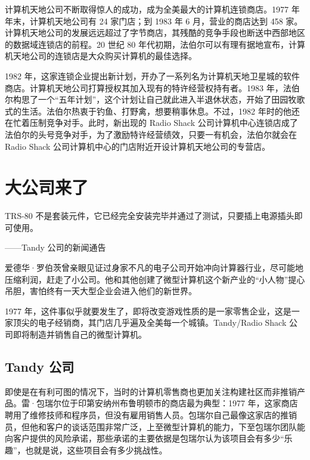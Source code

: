 \documentclass[12pt,UTF8]{ctexbook}
\begin{document}
计算机天地公司不断取得惊人的成功，成为全美最大的计算机连锁商店。1977 年年末，计算机天地公司有 24 家门店；到 1983 年 6 月，营业的商店达到 458 家。计算机天地公司的发展远远超过了字节商店，其残酷的竞争手段也断送中西部地区的数据域连锁店的前程。20 世纪 80 年代初期，法伯尔可以有理有据地宣布，计算机天地公司的连锁店是大众购买计算机的最佳选择。

1982 年，这家连锁企业提出新计划，开办了一系列名为计算机天地卫星城的软件商店。计算机天地公司打算授权其加入现有的特许经营权持有者。1983 年，法伯尔构思了一个“五年计划”，这个计划让自己就此进入半退休状态，开始了田园牧歌式的生活。法伯尔热衷于钓鱼、打野禽，想要稍事休息。不过，1982 年时的他还在忙着压制竞争对手。此时，新出现的 Radio Shack 公司计算机中心连锁店成了法伯尔的头号竞争对手，为了激励特许经营绩效，只要一有机会，法伯尔就会在 Radio Shack 公司计算机中心的门店附近开设计算机天地公司的专营店。





\section{大公司来了}


TRS-80 不是套装元件，它已经完全安装完毕并通过了测试，只要插上电源插头即可使用。

——Tandy 公司的新闻通告



爱德华·罗伯茨曾亲眼见证过身家不凡的电子公司开始冲向计算器行业，尽可能地压缩利润，赶走了小公司。他和其他创建了微型计算机这个新产业的“小人物”提心吊胆，害怕终有一天大型企业会进入他们的新世界。

1977 年，这件事似乎就要发生了，即将改变游戏性质的是一家零售企业，这是一家顶尖的电子经销商，其门店几乎遍及全美每一个城镇。Tandy/Radio Shack 公司即将制造并销售自己的微型计算机。





\subsection{Tandy 公司}


即使是在有利可图的情况下，当时的计算机零售商也更加关注构建社区而非推销产品。雷·包瑞尔位于印第安纳州布鲁明顿市的商店最为典型：1977 年，这家商店聘用了维修技师和程序员，但没有雇用销售人员。包瑞尔自己最像这家店的推销员，但他和客户的谈话范围非常广泛，上至微型计算机的能力，下至包瑞尔团队能向客户提供的风险承诺，那些承诺的主要依据是包瑞尔认为该项目会有多少“乐趣”，也就是说，这些项目会有多少挑战性。
\end{document}
